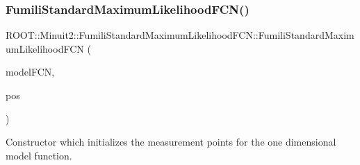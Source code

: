 \mbox{\label{classROOT_1_1Minuit2_1_1FumiliStandardMaximumLikelihoodFCN_af7dc80571b509a0a4f2f7ef821c3b1e6}} 
\subsubsection{\texorpdfstring{FumiliStandardMaximumLikelihoodFCN()}{FumiliStandardMaximumLikelihoodFCN()}\hspace{0.1cm}{\footnotesize\ttfamily [5/6]}}
{\footnotesize\ttfamily R\+O\+O\+T\+::\+Minuit2\+::\+Fumili\+Standard\+Maximum\+Likelihood\+F\+C\+N\+::\+Fumili\+Standard\+Maximum\+Likelihood\+F\+CN (\begin{DoxyParamCaption}\item[{const \mbox{\hyperlink{classROOT_1_1Minuit2_1_1ParametricFunction}{Parametric\+Function}} \&}]{model\+F\+CN,  }\item[{const std\+::vector$<$ double $>$ \&}]{pos }\end{DoxyParamCaption})\hspace{0.3cm}{\ttfamily [inline]}}

Constructor which initializes the measurement points for the one dimensional model function.


